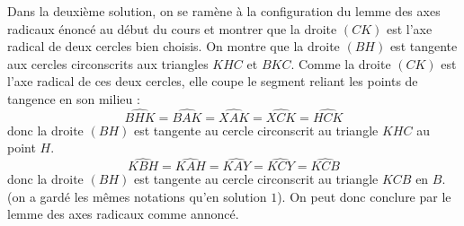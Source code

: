 \begin{sol}
Dans la deuxième solution, on se ramène à la configuration du lemme des axes radicaux énoncé au début du cours et montrer que la droite $(CK)$ est l'axe radical de deux cercles bien choisis.
On montre que la droite $(BH)$ est tangente aux cercles circonscrits aux triangles $KHC$ et $BKC$. Comme la droite $(CK)$ est l'axe radical de ces deux cercles, elle coupe le segment reliant les points de tangence en son milieu :
$$\widehat{BHK}=\widehat{BAK}=\widehat{XAK}=\widehat{XCK}=\widehat{HCK}$$ donc la droite $(BH)$ est tangente au cercle circonscrit au triangle $KHC$ au point $H$.
$$\widehat{KBH}=\widehat{KAH}=\widehat{KAY}=\widehat{KCY}=\widehat{KCB}$$ donc la droite $(BH)$ est tangente au cercle circonscrit au triangle $KCB$ en $B$.
(on a gardé les mêmes notations qu'en solution $1$).
On peut donc conclure par le lemme des axes radicaux comme annoncé.
\end{sol}


